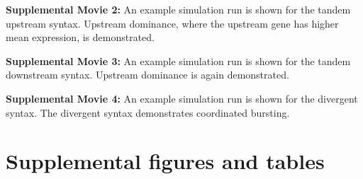 \documentclass[11pt]{article} %
\begin{document}
{\small \noindent \textbf{Supplemental Movie 2:} An example simulation run is shown for the tandem upstream syntax. Upstream dominance, where the upstream gene has higher mean expression, is demonstrated.}

{\small \noindent \textbf{Supplemental Movie 3:} An example simulation run is shown for the tandem downstream syntax. Upstream dominance is again demonstrated.}

{\small \noindent \textbf{Supplemental Movie 4:} An example simulation run is shown for the divergent syntax. The divergent syntax demonstrates coordinated bursting.}

\FloatBarrier


\printbibliography

\clearpage
\appendix
\titleformat{\subsection}[hang]{\bfseries}{\thesubsection}{0em}{\;\;}
\renewcommand{\appendixpagename}{Supplemental information}
\renewcommand{\thefigure}{S\arabic{figure}}
\renewcommand{\theequation}{S\arabic{equation}}
\setcounter{equation}{0}
\setcounter{figure}{0}
\appendixpage

\section{Supplemental figures and tables}
\FloatBarrier
\end{document}

